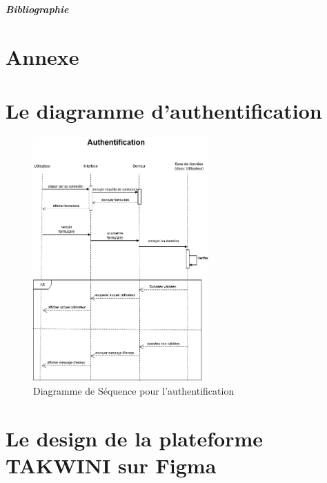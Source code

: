 \documentclass{article}
\begin{document}
\newpage
\begin{center}
{\Huge \textbf{\textit{Bibliographie}}}
\vspace{1cm}
\printbibliography[heading=none]





\end{center}





\newpage
\section{Annexe}
\appendix
\section{Le diagramme d'authentification}
\label{annexe-auth}

\begin{figure}[H]
  \centering
  \includegraphics[width=0.6\textwidth]{authentification(1.2).drawio.png}
  \caption{Diagramme de Séquence pour l'authentification}
  \end{figure}


\section{Le design de la plateforme TAKWINI sur Figma}
\label{annexe-design}
\end{document}
